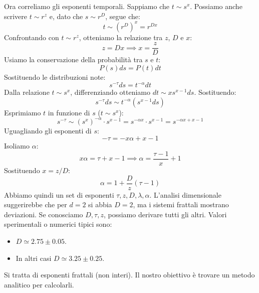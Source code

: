 Ora correliamo gli esponenti temporali. Sappiamo che $t \sim s^x$. Possiamo anche scrivere $t \sim r^z$ e, dato che $s \sim r^D$, segue che:
\begin{equation}
    t \sim (r^D)^x = r^{Dx}
\end{equation}
Confrontando con $t \sim r^z$, otteniamo la relazione tra $z$, $D$ e $x$:
\begin{equation}
    z = Dx \implies x = \frac{z}{D}
\end{equation}
Usiamo la conservazione della probabilità tra $s$ e $t$:
\begin{equation}
    P(s) ds = P(t) dt
\end{equation}
Sostituendo le distribuzioni note:
\begin{equation}
    s^{-\tau} ds = t^{-\alpha} dt
\end{equation}
Dalla relazione $t \sim s^x$, differenziando otteniamo $dt \sim x s^{x-1} ds$. Sostituendo:
\begin{equation}
    s^{-\tau} ds \sim t^{-\alpha} (s^{x-1} ds)
\end{equation}
Esprimiamo $t$ in funzione di $s$ ($t \sim s^x$):
\begin{equation}
    s^{-\tau} \sim (s^x)^{-\alpha} \cdot s^{x-1} = s^{-\alpha x} \cdot s^{x-1} = s^{-\alpha x + x - 1}
\end{equation}
Uguagliando gli esponenti di $s$:
\begin{equation}
    -\tau = -x\alpha + x - 1
\end{equation}
Isoliamo $\alpha$:
\begin{equation}
    x\alpha = \tau + x - 1 \implies \alpha = \frac{\tau - 1}{x} + 1
\end{equation}
Sostituendo $x = z/D$:
\begin{equation}
    \alpha = 1 + \frac{D}{z}(\tau - 1)
\end{equation}
Abbiamo quindi un set di esponenti $\tau, z, D, \lambda, \alpha$.
L'analisi dimensionale suggerirebbe che per $d=2$ si abbia $D=2$, ma i sistemi frattali mostrano deviazioni. Se conosciamo $D, \tau, z$, possiamo derivare tutti gli altri.
Valori sperimentali o numerici tipici sono:
\begin{itemize}
    \item $D \simeq 2.75 \pm 0.05$.
    \item In altri casi $D \simeq 3.25 \pm 0.25$.
\end{itemize}
Si tratta di esponenti frattali (non interi). Il nostro obiettivo è trovare un metodo analitico per calcolarli.

